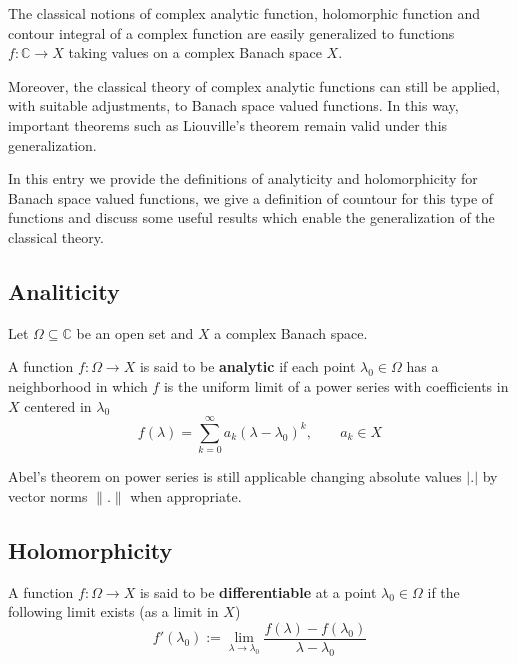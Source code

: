 \documentclass[12pt]{article}
\begin{document}

The classical notions of complex analytic function, holomorphic function and contour integral of a complex function are easily generalized to functions $f: \mathbb{C} \longrightarrow X$ taking values on a complex Banach space $X$.

Moreover, the classical theory of complex analytic functions can still be applied, with suitable adjustments, to Banach space valued functions. In this way, important theorems such as Liouville's theorem remain valid under this generalization.

In this entry we provide the definitions of analyticity and holomorphicity for Banach space valued functions, we give a definition of countour  for this type of functions and discuss some useful results which enable the generalization of the classical theory.

\subsection{Analiticity}
Let $\Omega \subseteq \mathbb{C}$ be an open set and $X$ a complex Banach space.

A function $f:\Omega \longrightarrow X$ is said to be {\bf analytic} if each point $\lambda_0 \in \Omega$ has a neighborhood in which $f$ is the uniform limit of a power series with coefficients in $X$ centered in $\lambda_0$
\begin{displaymath}
f(\lambda)= \sum_{k=0}^{\infty} a_k (\lambda -\lambda_0)^k, \;\;\;\;\;\;\; a_k \in X
\end{displaymath}

Abel's theorem on power series is still applicable changing absolute values $|.|$ by vector norms $\|.\|$ when appropriate.

\subsection{Holomorphicity}

A function $f:\Omega \longrightarrow X$ is said to be {\bf differentiable} at a point $\lambda_0 \in \Omega$ if the following limit exists (as a limit in $X$)
\begin{displaymath}
f'(\lambda_0):= \lim_{\lambda \rightarrow \lambda_0} \frac{f(\lambda)-f(\lambda_0)}{\lambda - \lambda_0}
\end{displaymath}
\end{document}
